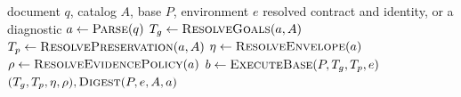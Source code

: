 \documentclass[a4paper,fleqn]{cas-sc}
\newcommand{\cl}{\operatorname{cl}}
\begin{document}
\begin{algorithm}[H]
\caption{Contract compilation and preparation (C1)}\label{alg:compile}
\begin{algorithmic}[1]
\Require document $q$, catalog $A$, base $P$, environment $e$
\Ensure resolved contract and identity, or a diagnostic
\State $a\gets\Call{Parse}{q}$
\State {}
\State $T_g\gets\Call{ResolveGoals}{a,A}$
\State $T_p\gets\Call{ResolvePreservation}{a,A}$
\State {}
\State $\eta\gets\Call{ResolveEnvelope}{a}$
\State $\rho\gets\Call{ResolveEvidencePolicy}{a}$
\State {}
\State $b\gets\Call{ExecuteBase}{P,T_g,T_p,e}$
  \State \Return {}
\EndIf
\State \Return $(T_g,T_p,\eta,\rho),\Call{Digest}{P,e,A,a}$
\end{algorithmic}
\end{algorithm}






























\end{document}
